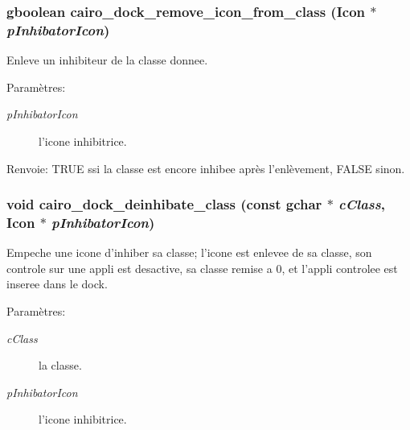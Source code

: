 \subsubsection{\setlength{\rightskip}{0pt plus 5cm}gboolean cairo\_\-dock\_\-remove\_\-icon\_\-from\_\-class ({\bf Icon} $\ast$ {\em pInhibatorIcon})}\label{cairo-dock-class-manager_8h_ea8b1b10e030ec4f822f064b0e511e50}


Enleve un inhibiteur de la classe donnee. \begin{Desc}
\item[Paramètres:]
\begin{description}
\item[{\em pInhibatorIcon}]l'icone inhibitrice. \end{description}
\end{Desc}
\begin{Desc}
\item[Renvoie:]TRUE ssi la classe est encore inhibee après l'enlèvement, FALSE sinon. \end{Desc}
\subsubsection{\setlength{\rightskip}{0pt plus 5cm}void cairo\_\-dock\_\-deinhibate\_\-class (const gchar $\ast$ {\em cClass}, {\bf Icon} $\ast$ {\em pInhibatorIcon})}\label{cairo-dock-class-manager_8h_d5897fb508c70f07f0a8e3d487917772}


Empeche une icone d'inhiber sa classe; l'icone est enlevee de sa classe, son controle sur une appli est desactive, sa classe remise a 0, et l'appli controlee est inseree dans le dock. \begin{Desc}
\item[Paramètres:]
\begin{description}
\item[{\em cClass}]la classe. \item[{\em pInhibatorIcon}]l'icone inhibitrice. \end{description}
\end{Desc}
